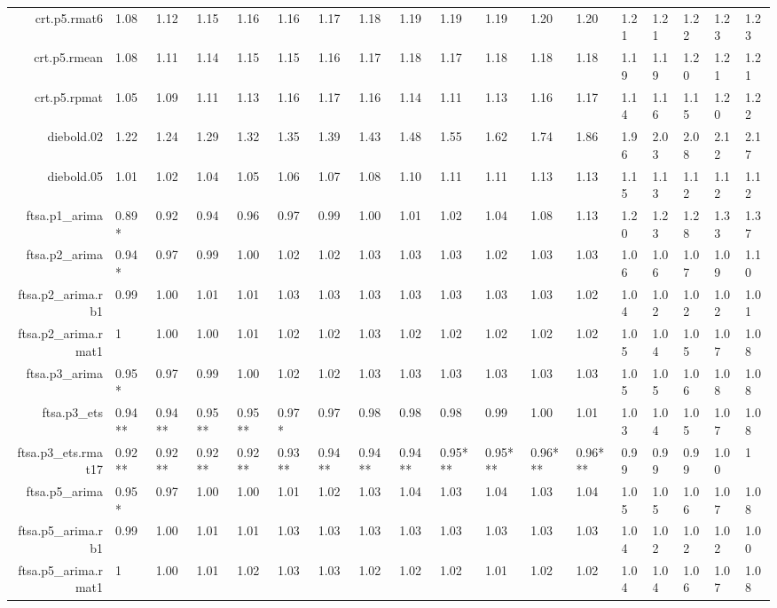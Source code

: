 \begin{table}[ht]
{\begin{tabular}{rlllllllllllllllll}
  crt.p5.rmat6 & 1.08 & 1.12 & 1.15 & 1.16 & 1.16 & 1.17 & 1.18 & 1.19 & 1.19 & 1.19 & 1.20 & 1.20 & 1.21 & 1.21 & 1.22 & 1.23 & 1.23 \\ 
  crt.p5.rmean & 1.08 & 1.11 & 1.14 & 1.15 & 1.15 & 1.16 & 1.17 & 1.18 & 1.17 & 1.18 & 1.18 & 1.18 & 1.19 & 1.19 & 1.20 & 1.21 & 1.21 \\ 
  crt.p5.rpmat & 1.05 & 1.09 & 1.11 & 1.13 & 1.16 & 1.17 & 1.16 & 1.14 & 1.11 & 1.13 & 1.16 & 1.17 & 1.14 & 1.16 & 1.15 & 1.20 & 1.22 \\ 
  diebold.02 & 1.22 & 1.24 & 1.29 & 1.32 & 1.35 & 1.39 & 1.43 & 1.48 & 1.55 & 1.62 & 1.74 & 1.86 & 1.96 & 2.03 & 2.08 & 2.12 & 2.17 \\ 
  diebold.05 & 1.01 & 1.02 & 1.04 & 1.05 & 1.06 & 1.07 & 1.08 & 1.10 & 1.11 & 1.11 & 1.13 & 1.13 & 1.15 & 1.13 & 1.12 & 1.12 & 1.12 \\ 
  ftsa.p1\_arima & 0.89* & 0.92 & 0.94 & 0.96 & 0.97 & 0.99 & 1.00 & 1.01 & 1.02 & 1.04 & 1.08 & 1.13 & 1.20 & 1.23 & 1.28 & 1.33 & 1.37 \\ 
  ftsa.p2\_arima & 0.94* & 0.97 & 0.99 & 1.00 & 1.02 & 1.02 & 1.03 & 1.03 & 1.03 & 1.02 & 1.03 & 1.03 & 1.06 & 1.06 & 1.07 & 1.09 & 1.10 \\ 
  ftsa.p2\_arima.rb1 & 0.99 & 1.00 & 1.01 & 1.01 & 1.03 & 1.03 & 1.03 & 1.03 & 1.03 & 1.03 & 1.03 & 1.02 & 1.04 & 1.02 & 1.02 & 1.02 & 1.01 \\ 
  ftsa.p2\_arima.rmat1 & 1 & 1.00 & 1.00 & 1.01 & 1.02 & 1.02 & 1.03 & 1.02 & 1.02 & 1.02 & 1.02 & 1.02 & 1.05 & 1.04 & 1.05 & 1.07 & 1.08 \\ 
  ftsa.p3\_arima & 0.95* & 0.97 & 0.99 & 1.00 & 1.02 & 1.02 & 1.03 & 1.03 & 1.03 & 1.03 & 1.03 & 1.03 & 1.05 & 1.05 & 1.06 & 1.08 & 1.08 \\ 
  ftsa.p3\_ets & 0.94** & 0.94** & 0.95** & 0.95** & 0.97* & 0.97 & 0.98 & 0.98 & 0.98 & 0.99 & 1.00 & 1.01 & 1.03 & 1.04 & 1.05 & 1.07 & 1.08 \\ 
  ftsa.p3\_ets.rmat17 & 0.92** & 0.92** & 0.92** & 0.92** & 0.93** & 0.94** & 0.94** & 0.94** & 0.95*** & 0.95*** & 0.96*** & 0.96*** & 0.99 & 0.99 & 0.99 & 1.00 & 1 \\ 
  ftsa.p5\_arima & 0.95* & 0.97 & 1.00 & 1.00 & 1.01 & 1.02 & 1.03 & 1.04 & 1.03 & 1.04 & 1.03 & 1.04 & 1.05 & 1.05 & 1.06 & 1.07 & 1.08 \\ 
  ftsa.p5\_arima.rb1 & 0.99 & 1.00 & 1.01 & 1.01 & 1.03 & 1.03 & 1.03 & 1.03 & 1.03 & 1.03 & 1.03 & 1.03 & 1.04 & 1.02 & 1.02 & 1.02 & 1.00 \\ 
  ftsa.p5\_arima.rmat1 & 1 & 1.00 & 1.01 & 1.02 & 1.03 & 1.03 & 1.02 & 1.02 & 1.02 & 1.01 & 1.02 & 1.02 & 1.04 & 1.04 & 1.06 & 1.07 & 1.08 \\ 

\end{tabular}}
\end{table}
